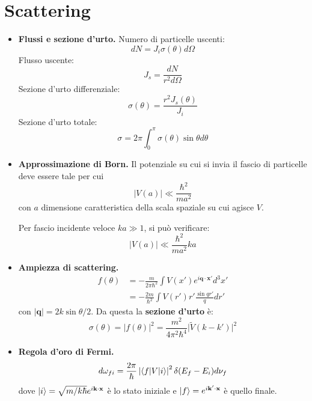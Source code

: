 \documentclass[11pt, a4paper]{scrartcl} %
\numberwithin{equation}{section}
\theoremstyle{style2}
\theoremstyle{style1}
\begin{document}
\section{Scattering}
\begin{multicols}{2}
	\begin{itemize}
		\item {\sffamily \bfseries Flussi e sezione d'urto.} 
			Numero di particelle uscenti:
			\begin{equation}
				dN = J_i \sigma (\theta ) d\Omega 
			\end{equation}
			Flusso uscente:
			\begin{equation}
				J_s = \frac{dN}{r^2 d\Omega }
			\end{equation}
			Sezione d'urto differenziale:
			\begin{equation}
				\sigma (\theta ) = \frac{r^2 J_s(\theta )}{J_i}
			\end{equation}
Sezione d'urto totale:
\begin{equation}
	\sigma = 2\pi \int_{0} ^\pi \sigma (\theta ) \sin \theta  d\theta 
\end{equation}
\item {\sffamily \bfseries Approssimazione di Born.} 
	Il potenziale su cui si invia il fascio di particelle deve essere tale per cui 
	\begin{equation}
		\lvert V(a) \rvert  \ll \frac{\hbar ^2}{ma^2}
	\end{equation}
	con $a$ dimensione caratteristica della scala spaziale su cui agisce $V$.

	Per fascio incidente veloce $ka \gg 1$, si pu\`o verificare:
	\begin{equation}
		\lvert V(a) \rvert \ll \frac{\hbar ^2}{ma^2}ka
	\end{equation}
	\item {\sffamily \bfseries Ampiezza di scattering.} 
		\begin{equation}
			\begin{split}
				f(\theta ) &=-\frac{m}{2\pi \hbar ^2} \int V(x') e^{i \mathbf{q} \cdot \mathbf{x} '} d^3 x'\\
					   &= - \frac{2m}{\hbar ^2}\int V(r') r' \frac{\sin qr'}{q} dr'
			\end{split}
		\end{equation}
		con $\lvert \mathbf{q}  \rvert = 2k \sin \theta  / 2$. Da questa la \textbf{sezione d'urto} \`e:
		\begin{equation}
			\sigma (\theta ) = \lvert f(\theta ) \rvert ^2 = \frac{m^2}{4\pi^2 \hbar ^4} \lvert \widetilde{V}(k-k') \rvert ^2
		\end{equation}
		\item {\sffamily \bfseries Regola d'oro di Fermi.} 
			\begin{equation}
				d\omega_{fi} = \frac{2\pi}{\hbar } \left\lvert \braket{f|V|i}  \right\rvert ^2 \delta (E_f -E_i) d\nu _f
			\end{equation}
			dove $\ket{i} = \sqrt{m / k\hbar } e^{i \mathbf{k} \cdot \mathbf{x} } $ \`e lo stato iniziale e $\ket{f} = e^{i \mathbf{k} ' \cdot \mathbf{x} } $ \`e quello finale.
			

\end{itemize}
\end{multicols}
\end{document}
